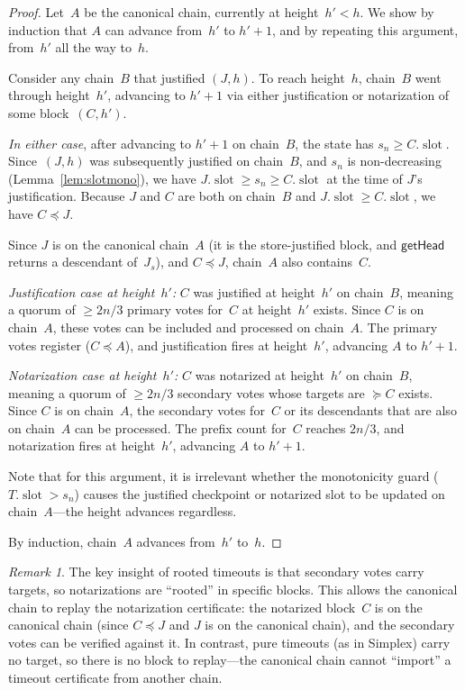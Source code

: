\ifx\litemode\undefined\documentclass{article}\fi
\newcommand{\slot}[0]{\ensuremath{\operatorname{\mathrm{slot}}}}
\theoremstyle{plain}
\theoremstyle{definition}
\theoremstyle{remark}
\newtheorem{remark}[theorem]{Remark}
\begin{document}
\begin{proof}
Let~$A$ be the canonical chain, currently at height~$h' < h$.
We show by induction that $A$ can advance from~$h'$ to $h' + 1$, and by repeating this argument, from~$h'$ all the way to~$h$.

Consider any chain~$B$ that justified $(J, h)$.
To reach height~$h$, chain~$B$ went through height~$h'$, advancing to $h' + 1$ via either justification or notarization of some block~$(C, h')$.

\emph{In either case}, after advancing to $h' + 1$ on chain~$B$, the state has $s_n \geq C.\slot$.
Since~$(J, h)$ was subsequently justified on chain~$B$, and $s_n$ is non-decreasing (Lemma~\ref{lem:slotmono}), we have $J.\slot \geq s_n \geq C.\slot$ at the time of $J$'s justification.
Because $J$ and $C$ are both on chain~$B$ and $J.\slot \geq C.\slot$, we have $C \preceq J$.

Since $J$ is on the canonical chain~$A$ (it is the store-justified block, and $\textsf{getHead}$ returns a descendant of~$J_s$), and $C \preceq J$, chain~$A$ also contains~$C$.

\emph{Justification case at height~$h'$:}
$C$ was justified at height~$h'$ on chain~$B$, meaning a quorum of $\geq 2n/3$ primary votes for~$C$ at height~$h'$ exists.
Since $C$ is on chain~$A$, these votes can be included and processed on chain~$A$.
The primary votes register ($C \preceq A$), and justification fires at height~$h'$, advancing $A$ to $h' + 1$.

\emph{Notarization case at height~$h'$:}
$C$ was notarized at height~$h'$ on chain~$B$, meaning a quorum of $\geq 2n/3$ secondary votes whose targets are $\succeq C$ exists.
Since $C$ is on chain~$A$, the secondary votes for~$C$ or its descendants that are also on chain~$A$ can be processed.
The prefix count for~$C$ reaches $2n/3$, and notarization fires at height~$h'$, advancing $A$ to $h' + 1$.

Note that for this argument, it is irrelevant whether the monotonicity guard ($T.\slot > s_n$) causes the justified checkpoint or notarized slot to be updated on chain~$A$---the height advances regardless.

By induction, chain~$A$ advances from~$h'$ to~$h$.
\end{proof}

\begin{remark}\label{rem:notarization-targets}
The key insight of rooted timeouts is that secondary votes carry targets, so notarizations are ``rooted'' in specific blocks.
This allows the canonical chain to replay the notarization certificate: the notarized block~$C$ is on the canonical chain (since $C \preceq J$ and $J$ is on the canonical chain), and the secondary votes can be verified against it.
In contrast, pure timeouts (as in Simplex) carry no target, so there is no block to replay---the canonical chain cannot ``import'' a timeout certificate from another chain.
\end{remark}
\end{document}
